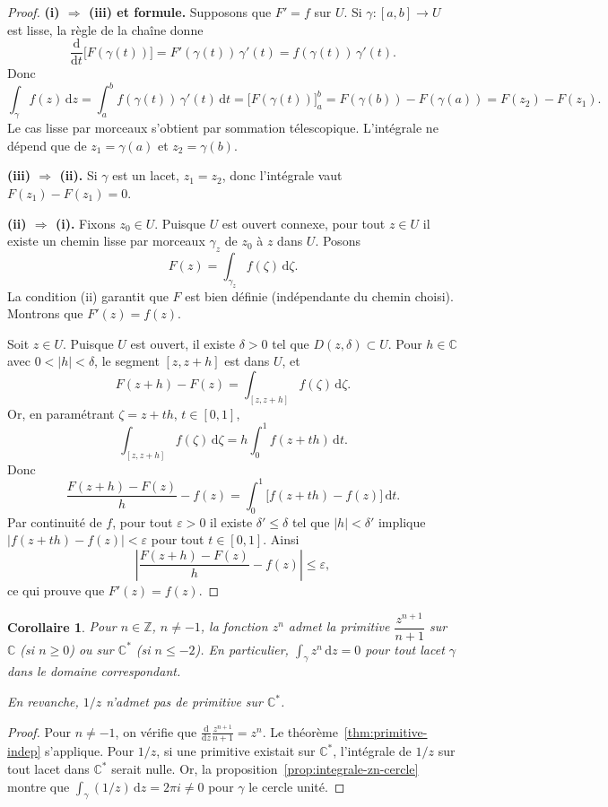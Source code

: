 \documentclass[12pt,a4paper,openany]{book}
\theoremstyle{definition}
\theoremstyle{plain}
\newtheorem{corollaire}[definition]{Corollaire}
\theoremstyle{remark}
\newcommand{\C}{\mathbb{C}}
\newcommand{\Z}{\mathbb{Z}}
\newcommand{\dd}{\mathrm{d}}
\newcommand{\abs}[1]{\left|#1\right|}
\begin{document}
\begin{proof}
\textbf{(i) $\Rightarrow$ (iii) et formule.}
Supposons que $F' = f$ sur $U$. Si $\gamma \colon [a,b] \to U$ est lisse,
la règle de la chaîne donne
\[
  \frac{\dd}{\dd t}\bigl[F(\gamma(t))\bigr] = F'(\gamma(t))\,\gamma'(t)
  = f(\gamma(t))\,\gamma'(t).
\]
Donc
\[
  \int_\gamma f(z)\,\dd z
  = \int_a^b f(\gamma(t))\,\gamma'(t)\,\dd t
  = \bigl[F(\gamma(t))\bigr]_a^b
  = F(\gamma(b)) - F(\gamma(a))
  = F(z_2) - F(z_1).
\]
Le cas lisse par morceaux s'obtient par sommation télescopique. L'intégrale ne
dépend que de $z_1 = \gamma(a)$ et $z_2 = \gamma(b)$.

\textbf{(iii) $\Rightarrow$ (ii).} Si $\gamma$ est un lacet, $z_1 = z_2$,
donc l'intégrale vaut $F(z_1) - F(z_1) = 0$.

\textbf{(ii) $\Rightarrow$ (i).} Fixons $z_0 \in U$. Puisque $U$ est ouvert
connexe, pour tout $z \in U$ il existe un chemin lisse par morceaux
$\gamma_z$ de $z_0$ à $z$ dans $U$. Posons
\[
  F(z) = \int_{\gamma_z} f(\zeta)\,\dd\zeta.
\]
La condition (ii) garantit que $F$ est bien définie (indépendante du chemin
choisi). Montrons que $F'(z) = f(z)$.

Soit $z \in U$. Puisque $U$ est ouvert, il existe $\delta > 0$ tel que
$D(z,\delta) \subset U$. Pour $h \in \C$ avec $0 < \abs{h} < \delta$,
le segment $[z, z+h]$ est dans $U$, et
\[
  F(z+h) - F(z) = \int_{[z,z+h]} f(\zeta)\,\dd\zeta.
\]
Or, en paramétrant $\zeta = z + th$, $t \in [0,1]$,
\[
  \int_{[z,z+h]} f(\zeta)\,\dd\zeta = h \int_0^1 f(z+th)\,\dd t.
\]
Donc
\[
  \frac{F(z+h) - F(z)}{h} - f(z)
  = \int_0^1 \bigl[f(z+th) - f(z)\bigr]\,\dd t.
\]
Par continuité de $f$, pour tout $\varepsilon > 0$ il existe
$\delta' \leq \delta$ tel que $\abs{h} < \delta'$ implique
$\abs{f(z+th) - f(z)} < \varepsilon$ pour tout $t \in [0,1]$. Ainsi
\[
  \abs{\frac{F(z+h) - F(z)}{h} - f(z)} \leq \varepsilon,
\]
ce qui prouve que $F'(z) = f(z)$.
\end{proof}

\begin{corollaire}\label{cor:zn-primitive}
Pour $n \in \Z$, $n \neq -1$, la fonction $z^n$ admet la primitive
$\dfrac{z^{n+1}}{n+1}$ sur $\C$ (si $n \geq 0$) ou sur $\C^*$ (si
$n \leq -2$). En particulier, $\displaystyle \int_\gamma z^n\,\dd z = 0$
pour tout lacet $\gamma$ dans le domaine correspondant.

En revanche, $1/z$ n'admet \emph{pas} de primitive sur $\C^*$.
\end{corollaire}

\begin{proof}
Pour $n \neq -1$, on vérifie que $\frac{\dd}{\dd z}\frac{z^{n+1}}{n+1}
= z^n$. Le théorème~\ref{thm:primitive-indep} s'applique. Pour $1/z$, si
une primitive existait sur $\C^*$, l'intégrale de $1/z$ sur tout lacet dans
$\C^*$ serait nulle. Or, la proposition~\ref{prop:integrale-zn-cercle}
montre que $\int_\gamma (1/z)\,\dd z = 2\pi i \neq 0$ pour $\gamma$ le
cercle unité.
\end{proof}
\end{document}

